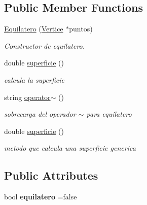 \subsection*{Public Member Functions}
\begin{DoxyCompactItemize}
\item 
\hyperlink{class_equilatero_a27bc291f53fa7dfa9a4cc3617bca5ecf}{Equilatero} (\hyperlink{class_vertice}{Vertice} $\ast$puntos)
\begin{DoxyCompactList}\small\item\em Constructor de equilatero. \end{DoxyCompactList}\item 
\mbox{\label{class_equilatero_a16d707c455bde08915f06eeff3a98a99}} 
double \hyperlink{class_equilatero_a16d707c455bde08915f06eeff3a98a99}{superficie} ()
\begin{DoxyCompactList}\small\item\em calcula la superficie \end{DoxyCompactList}\item 
\mbox{\label{class_equilatero_a1e103b1d16b785da9a8b43b17739ad7a}} 
string \hyperlink{class_equilatero_a1e103b1d16b785da9a8b43b17739ad7a}{operator$\sim$} ()
\begin{DoxyCompactList}\small\item\em sobrecarga del operador $\sim$ para equilatero \end{DoxyCompactList}\item 
\mbox{\label{class_equilatero_a16d707c455bde08915f06eeff3a98a99}} 
double \hyperlink{class_equilatero_a16d707c455bde08915f06eeff3a98a99}{superficie} ()
\begin{DoxyCompactList}\small\item\em metodo que calcula una superficie generica \end{DoxyCompactList}\end{DoxyCompactItemize}
\subsection*{Public Attributes}
\begin{DoxyCompactItemize}
\item 
\mbox{\label{class_equilatero_a75d6a8d67fcb3d8682e868c6348055ae}} 
bool {\bfseries equilatero} =false
\end{DoxyCompactItemize}
